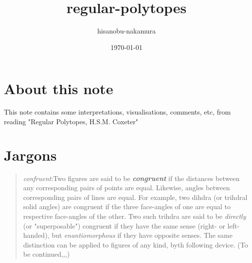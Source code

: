 \documentclass{article}
\author{hisanobu-nakamura}
\date{\today}
\title{regular-polytopes}
\begin{document}
\maketitle
\tableofcontents

\section{About this note}
\label{sec-1}
This note contains some interpretations, visualisations, comments, etc, from reading "Regular Polytopes, H.S.M. Coxeter"
\section{Jargons}
\label{sec-2}
\begin{quote}
\emph{confruent}:Two figures are said to be \textbf{\emph{congruent}} if the distances between any corresponding pairs of points are equal. Likewise, angles between corresponding pairs of lines are equal. 
For example, two dihdra (or trihdral solid angles) are congruent if the three face-angles of one are equal to respective face-angles of the other. 
Two such trihdra are said to be \emph{directly} (or "superposable") congruent if they have the same sense (right- or left-handed), but \emph{enantiomorphous} if they have opposite senses. 
The same distinction can be applied to figures of any kind, byth following device. (To be continued,,,)
\end{quote}
\end{document}
